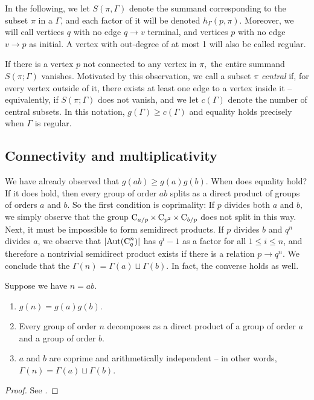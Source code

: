 In the following, we let $S(\pi, \Gamma)$ denote the summand corresponding to the subset $\pi$ in a  $\Gamma$, and each factor of it will be denoted $h_\Gamma(p, \pi).$ Moreover, we will call vertices $q$ with no edge $q \rightarrow v$ terminal, and vertices $p$ with no edge $v \rightarrow p$ as initial. A vertex with out-degree of at most 1 will also be called regular.

If there is a vertex $p$ not connected to any vertex in $\pi,$ the entire summand $S(\pi; \Gamma)$ vanishes. Motivated by this observation, we call a subset $\pi$ \emph{central} if, for every vertex outside of it, there exists at least one edge to a vertex inside it -- equivalently, if $S(\pi; \Gamma)$ does not vanish, and we let $c(\Gamma)$ denote the number of central subsets. In this notation, $g(\Gamma) \ge c(\Gamma)$ and equality holds precisely when $\Gamma$ is regular.

\subsection{Connectivity and multiplicativity}
We have already observed that $g(ab) \ge g(a)g(b).$ When does equality hold? If it does hold, then every group of order $ab$ splits as a direct product of groups of orders $a$ and $b.$ So the first condition is coprimality: If $p$ divides both $a$ and $b,$ we simply observe that the group $\operatorname{C}_{a/p} \times \operatorname{C}_{p^2} \times \operatorname{C}_{b/p}$ does not split in this way. Next, it must be impossible to form semidirect products. If $p$ divides $b$ and $q^n$ divides $a$, we observe that $\lvert\operatorname{Aut}(\operatorname{C}_{q}^n)\rvert$ has $q^i - 1$ as a factor for all $1 \le i \le n$, and therefore a nontrivial semidirect product exists if there is a relation $p \rightarrow q^n.$ We conclude that the $\Gamma(n) = \Gamma(a) \sqcup \Gamma(b)$. In fact, the converse holds as well.

\begin{thm}
	Suppose we have $n = ab$.
	\begin{enumerate}\listspace
		\item $g(n) = g(a)g(b).$
		\item Every group of order $n$ decomposes as a direct product of a group of order $a$ and a group of order $b.$
		\item $a$ and $b$ are coprime and arithmetically independent -- in other words, $\Gamma(n) = \Gamma(a) \sqcup \Gamma(b)$.
	\end{enumerate} \textspace
\end{thm}
\begin{proof}
	See {\cite[Lemma~21.19]{monolith}}.
\end{proof}

